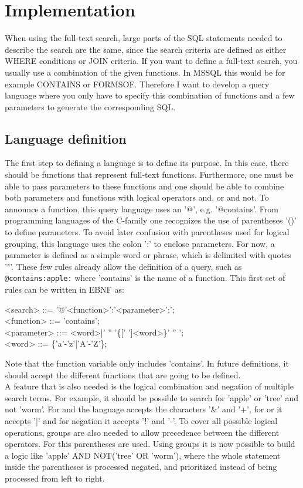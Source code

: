 \newpage
\section{Implementation}
When using the full-text search, large parts of the SQL statements needed to describe the search are the same, since the search criteria are defined as either WHERE conditions or JOIN criteria. If you want to define a full-text search, you usually use a combination of the given functions. In MSSQL this would be for example CONTAINS or FORMSOF. Therefore I want to develop a query language where you only have to specify this combination of functions and a few parameters to generate the corresponding SQL.
\subsection{Language definition}
The first step to defining a language is to define its purpose. In this case, there should be functions that represent full-text functions. Furthermore, one must be able to pass parameters to these functions and one should be able to combine both parameters and functions with logical operators and, or and not.
To announce a function, this query language uses an '@', e.g. '@contains'. From programming languages of the C-family one recognizes the use of parentheses '()' to define parameters. To avoid later confusion with parentheses used for logical grouping, this language uses the colon ':' to enclose parameters. For now, a parameter is defined as a simple word or phrase, which is delimited with quotes '"'. These few rules already allow the definition of a query, such as \lstinline[language=Fulltext-Search]$@contains:apple:$ where 'contains' is the name of a function.
This first set of rules can be written in \ac{EBNF} as:
\begin{grammar}
    <search> ::= '@'<function>':'<parameter>':'; \\
    <function> ::= 'contains'; \\
    <parameter> ::= <word>|' '' '\{[' ']<word>\}' '' '; \\
    <word> ::= \{'a'-'z'|'A'-'Z'\};
\end{grammar}
Note that the function variable only includes 'contains'. In future definitions, it should accept the different functions that are going to be defined.\\
A feature that is also needed is the logical combination and negation of multiple search terms. For example, it should be possible to search for 'apple' or 'tree' and not 'worm'. For and the language accepts the characters '\&' and '+', for or it accepts '|' and for negation it accepts '!' and '-'. To cover all possible logical operations, groups are also needed to allow precedence between the different operators. For this parentheses are used. Using groups it is now possible to build a logic like 'apple' AND NOT('tree' OR 'worm'), where the whole statement inside the parentheses is processed negated, and prioritized instead of being processed from left to right.
